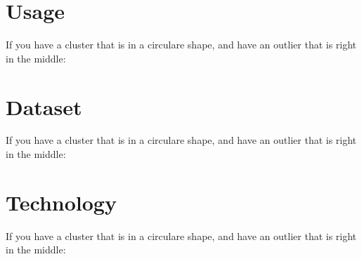 \documentclass[a4paper,11pt]{article}
\begin{document}
\section*{Usage}
If you have a cluster that is in a circulare shape, and have an outlier that is right in the middle:

\section*{Dataset}
If you have a cluster that is in a circulare shape, and have an outlier that is right in the middle:

\section*{Technology}
If you have a cluster that is in a circulare shape, and have an outlier that is right in the middle:
\end{document}
